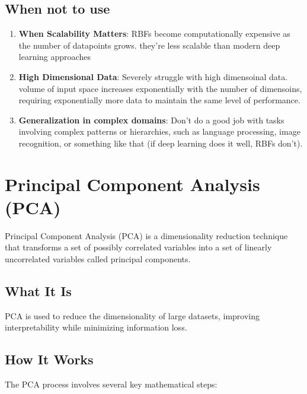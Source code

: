 \documentclass[12pt]{article}
\begin{document}
\subsection{When not to use}
\begin{enumerate}
\item \textbf{When Scalability Matters}: RBFs become computationally expensive as the number of datapoints grows. they're less scalable than modern deep learning approaches
\item \textbf{High Dimensional Data}: Severely struggle with high dimensoinal data. volume of input space increases exponentially with the number of dimensoins, requiring exponentially more data to maintain the same level of performance.
\item \textbf{Generalization in complex domains}: Don't do a good job with tasks involving complex patterns or hierarchies, such as language processing, image recognition, or something like that (if deep learning does it well, RBFs don't). 
\end{enumerate}



\section{Principal Component Analysis (PCA)}

Principal Component Analysis (PCA) is a dimensionality reduction technique that transforms a set of possibly correlated variables into a set of linearly uncorrelated variables called principal components.

\subsection{What It Is}
PCA is used to reduce the dimensionality of large datasets, improving interpretability while minimizing information loss.

\subsection{How It Works}
The PCA process involves several key mathematical steps:
\end{document}
